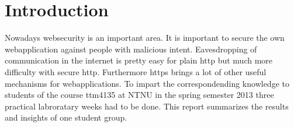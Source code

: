 \section {Introduction}
Nowadays websecurity is an important area. It is important to secure the own webapplication against people with malicious intent. Eavesdropping of communication in the internet is pretty easy for plain http but much more difficulty with secure http.  Furthermore https brings a lot of other useful mechanisms for webapplications. 
To impart the correspondending knowledge to students of the course ttm4135 at NTNU in the spring semester 2013 three practical labroratary weeks had to be done. This report summarizes the results and insights of one student group.
